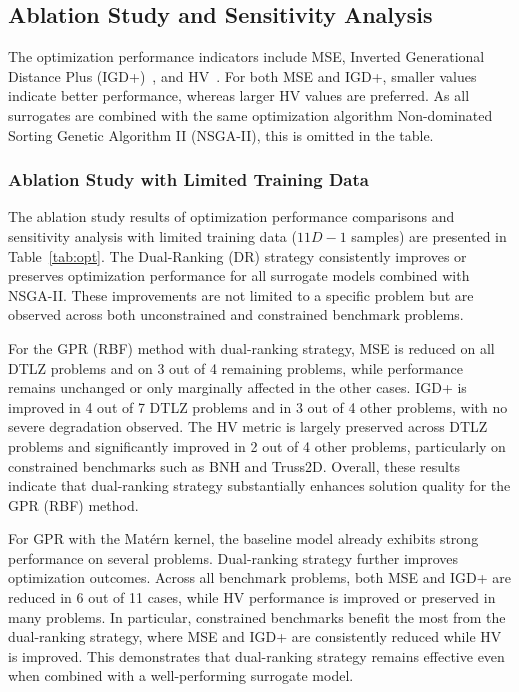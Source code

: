 \documentclass{article}
\begin{document}
\subsection{Ablation Study and Sensitivity Analysis}
The optimization performance indicators include MSE, Inverted Generational Distance Plus (IGD+)~\cite{igd_plus}, and HV~\cite{hypervolume}. For both MSE and IGD+, smaller values indicate better performance, whereas larger HV values are preferred. As all surrogates are combined with the same optimization algorithm Non-dominated Sorting Genetic Algorithm II (NSGA-II), this is omitted in the table.

\subsubsection{Ablation Study with Limited Training Data}
The ablation study results of optimization performance comparisons and sensitivity analysis with limited training data ($11D-1$ samples) are presented in Table~\ref{tab:opt}. The Dual-Ranking (DR) strategy consistently improves or preserves optimization performance for all surrogate models combined with NSGA-II. These improvements are not limited to a specific problem but are observed across both unconstrained and constrained benchmark problems.

For the GPR (RBF) method with dual-ranking strategy, MSE is reduced on all DTLZ problems and on 3 out of 4 remaining problems, while performance remains unchanged or only marginally affected in the other cases. IGD+ is improved in 4 out of 7 DTLZ problems and in 3 out of 4 other problems, with no severe degradation observed. The HV metric is largely preserved across DTLZ problems and significantly improved in 2 out of 4 other problems, particularly on constrained benchmarks such as BNH and Truss2D. Overall, these results indicate that dual-ranking strategy substantially enhances solution quality for the GPR (RBF) method.

For GPR with the Mat\'ern kernel, the baseline model already exhibits strong performance on several problems. Dual-ranking strategy further improves optimization outcomes. Across all benchmark problems, both MSE and IGD+ are reduced in 6 out of 11 cases, while HV performance is improved or preserved in many problems. In particular, constrained benchmarks benefit the most from the dual-ranking strategy, where MSE and IGD+ are consistently reduced while HV is improved. This demonstrates that dual-ranking strategy remains effective even when combined with a well-performing surrogate model.
\end{document}
